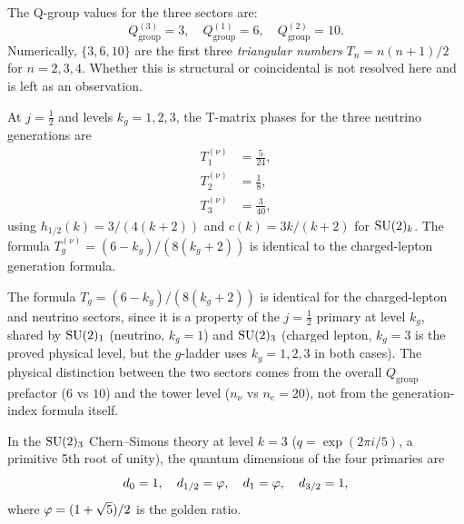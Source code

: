 \begin{remark}
\label{P17:rem:qgroup_hierarchy}
The Q-group values for the three sectors are:
\[
  Q_{\mathrm{group}}^{(3)} = 3, \quad
  Q_{\mathrm{group}}^{(1)} = 6, \quad
  Q_{\mathrm{group}}^{(2)} = 10.
\]
Numerically, $\{3,6,10\}$ are the first three \emph{triangular numbers}
$T_n=n(n+1)/2$ for $n=2,3,4$. Whether this is structural or
coincidental is not resolved here and is left as an observation.
\end{remark}

\begin{proposition}
\label{P17:prop:nu_Tphases}
At $j=\tfrac12$ and levels $k_g=1,2,3$, the T-matrix phases for the
three neutrino generations are
\begin{align*}
  T_1^{(\nu)} &= \tfrac{5}{24},\\
  T_2^{(\nu)} &= \tfrac{1}{8},\\
  T_3^{(\nu)} &= \tfrac{3}{40},
\end{align*}
using $h_{1/2}(k)=3/(4(k+2))$ and $c(k)=3k/(k+2)$ for $\mathrm{SU}(2)_k$.
The formula $T_g^{(\nu)}=(6-k_g)/(8(k_g+2))$ is identical to the
charged-lepton generation formula.
\end{proposition}

\begin{remark}
\label{P17:rem:same_ladder}
The formula $T_g = (6-k_g)/(8(k_g+2))$ is identical for the
charged-lepton and neutrino sectors, since it is a property of the
$j=\tfrac12$ primary at level $k_g$, shared by $\mathrm{SU}(2)_1$ (neutrino,
$k_g=1$) and $\mathrm{SU}(2)_3$ (charged lepton, $k_g=3$ is the proved
physical level, but the $g$-ladder uses $k_g=1,2,3$ in both cases).
The physical distinction between the two sectors comes from the
overall $Q_{\mathrm{group}}$ prefactor ($6$ vs $10$) and the
tower level ($n_\nu$ vs $n_e=20$), not from the generation-index
formula itself.
\end{remark}

\begin{proposition}[Quantum dimension at level $k=3$]
\label{P17:prop:qh1_dimq}
In the $\mathrm{SU}(2)_3$ Chern--Simons theory at level $k=3$
($q=\exp(2\pi i/5)$, a primitive 5th root of unity), the quantum
dimensions of the four primaries are
\[
  d_{0} = 1,
  \quad
  d_{1/2} = \varphi,
  \quad
  d_{1} = \varphi,
  \quad
  d_{3/2} = 1,
\]
where $\varphi=(1+\sqrt5)/2$ is the golden ratio.
\end{proposition}

